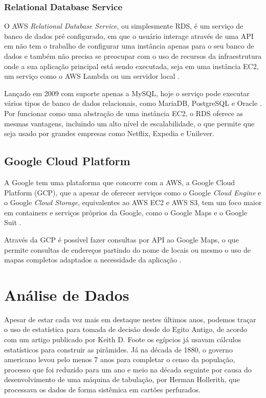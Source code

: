 \subsubsection{Relational Database Service}

\indent
\par O AWS \textit{Relational Database Service}, ou simplesmente RDS, é um serviço de banco de dados pré configurado, em que o usuário interage através de uma API em não tem o trabalho de configurar uma instância apenas para o seu banco de dados e também não precisa se preocupar com o uso de recursos da infraestrutura onde a sua aplicação principal está sendo executada, seja em uma instância EC2, um serviço como o AWS Lambda ou um servidor local \cite{AWSRDS_B}.
\par Lançado em 2009 com suporte apenas a MySQL, hoje o serviço pode executar vários tipos de banco de dados relacionais, como MariaDB, PostgreSQL e Oracle \cite{AWSRDS}. Por funcionar como uma abstração de uma instância EC2, o RDS oferece as mesmas vantagens, incluindo um alto nível de escalabilidade, o que permite que seja usado por grandes empresas como Netflix, Expedia e Unilever.

\subsection{Google Cloud Platform}

\indent
\par A Google tem uma plataforma que concorre com a AWS, a Google Cloud Platform (GCP), que a apesar de oferecer serviços como o Google \textit{Cloud Engine} e o Google \textit{Cloud Storage}, equivalentes ao AWS EC2 e AWS S3, tem um foco maior em containers e serviços próprios da Google, como o Google Maps e o Google Suit \cite{ZdNet}.
\indent
\par Através da GCP é possível fazer consultas por API ao Google Maps, o que permite consultas de endereços partindo do nome de locais ou mesmo o uso de mapas completos adaptados a necessidade da aplicação \cite{GMP}.

\section{Análise de Dados}

\indent
\par Apesar de estar cada vez mais em destaque nestes últimos anos, podemos traçar o uso de estatística para tomada de decisão desde do Egito Antigo, de acordo com um artigo publicado por Keith D. Foote \cite{Foote2018} os egípcios já usavam cálculos estatísticos para construir as pirâmides. Já na década de 1880, o governo americano levou pelo menos 7 anos para completar o censo da população, processo que foi reduzido para um ano e meio na década seguinte por causa do desenvolvimento de uma máquina de tabulação, por Herman Hollerith, que processava os dados de forma sistêmica em cartões perfurados.

